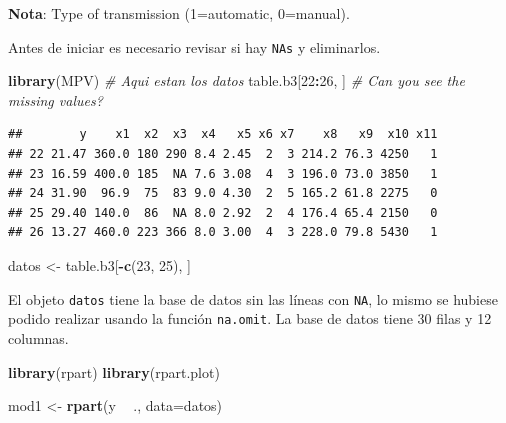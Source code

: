 \documentclass[]{book}
\makeatletter
\newenvironment{Shaded}{\begin{snugshade}}{\end{snugshade}}
\newcommand{\CommentTok}[1]{\textcolor[rgb]{0.56,0.35,0.01}{\textit{#1}}}
\newcommand{\DataTypeTok}[1]{\textcolor[rgb]{0.13,0.29,0.53}{#1}}
\newcommand{\DecValTok}[1]{\textcolor[rgb]{0.00,0.00,0.81}{#1}}
\newcommand{\KeywordTok}[1]{\textcolor[rgb]{0.13,0.29,0.53}{\textbf{#1}}}
\newcommand{\NormalTok}[1]{#1}
\newcommand{\OperatorTok}[1]{\textcolor[rgb]{0.81,0.36,0.00}{\textbf{#1}}}
\newcommand{\StringTok}[1]{\textcolor[rgb]{0.31,0.60,0.02}{#1}}
\newenvironment{kframe}{%
\medskip{}
\setlength{\fboxsep}{.8em}
 \def\at@end@of@kframe{}%
 \ifinner\ifhmode%
  \def\at@end@of@kframe{\end{minipage}}%
  \begin{minipage}{\columnwidth}%
 \fi\fi%
 \def\FrameCommand##1{\hskip\@totalleftmargin \hskip-\fboxsep
 \colorbox{shadecolor}{##1}\hskip-\fboxsep
     \hskip-\linewidth \hskip-\@totalleftmargin \hskip\columnwidth}%
 \MakeFramed {\advance\hsize-\width
   \@totalleftmargin\z@ \linewidth\hsize
   \@setminipage}}%
 {\par\unskip\endMakeFramed%
 \at@end@of@kframe}
\renewenvironment{Shaded}{\begin{kframe}}{\end{kframe}}
\makeatother
\begin{document}
\textbf{Nota}: Type of transmission (1=automatic, 0=manual).

Antes de iniciar es necesario revisar si hay \texttt{NA\textquotesingle{}s} y eliminarlos.

\begin{Shaded}
\begin{Highlighting}[]
\KeywordTok{library}\NormalTok{(MPV)  }\CommentTok{# Aqui estan los datos}
\NormalTok{table.b3[}\DecValTok{22}\OperatorTok{:}\DecValTok{26}\NormalTok{, ] }\CommentTok{# Can you see the missing values?}
\end{Highlighting}
\end{Shaded}

\begin{verbatim}
##        y    x1  x2  x3  x4   x5 x6 x7    x8   x9  x10 x11
## 22 21.47 360.0 180 290 8.4 2.45  2  3 214.2 76.3 4250   1
## 23 16.59 400.0 185  NA 7.6 3.08  4  3 196.0 73.0 3850   1
## 24 31.90  96.9  75  83 9.0 4.30  2  5 165.2 61.8 2275   0
## 25 29.40 140.0  86  NA 8.0 2.92  2  4 176.4 65.4 2150   0
## 26 13.27 460.0 223 366 8.0 3.00  4  3 228.0 79.8 5430   1
\end{verbatim}

\begin{Shaded}
\begin{Highlighting}[]
\NormalTok{datos <-}\StringTok{ }\NormalTok{table.b3[}\OperatorTok{-}\KeywordTok{c}\NormalTok{(}\DecValTok{23}\NormalTok{, }\DecValTok{25}\NormalTok{), ]}
\end{Highlighting}
\end{Shaded}

El objeto \texttt{datos} tiene la base de datos sin las líneas con \texttt{NA}, lo mismo se hubiese podido realizar usando la función \texttt{na.omit}. La base de datos tiene 30 filas y 12 columnas.

\begin{Shaded}
\begin{Highlighting}[]
\KeywordTok{library}\NormalTok{(rpart)}
\KeywordTok{library}\NormalTok{(rpart.plot)}
\end{Highlighting}
\end{Shaded}

\begin{Shaded}
\begin{Highlighting}[]
\NormalTok{mod1 <-}\StringTok{ }\KeywordTok{rpart}\NormalTok{(y }\OperatorTok{~}\StringTok{ }\NormalTok{., }\DataTypeTok{data=}\NormalTok{datos)}
\end{Highlighting}
\end{Shaded}
\end{document}
